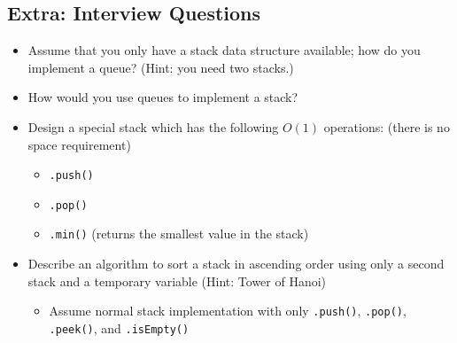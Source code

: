\documentclass[10pt]{article}
\begin{document}
\subsection*{Extra: Interview Questions}
\begin{itemize}
    \item Assume that you only have a stack data structure available; how do you implement a queue? (Hint: you need two stacks.)
    \item How would you use queues to implement a stack?
    \item Design a special stack which has the following $O(1)$ operations: (there is no space requirement)
    \begin{itemize}
        \item \texttt{.push()}
        \item \texttt{.pop()}
        \item \texttt{.min()} (returns the smallest value in the stack)
    \end{itemize}
    \item Describe an algorithm to sort a stack in ascending order using only a second stack and a temporary variable (Hint: Tower of Hanoi)
    \begin{itemize}
        \item Assume normal stack implementation with only \texttt{.push()}, \texttt{.pop()}, \texttt{.peek()}, and \texttt{.isEmpty()}
    \end{itemize}
\end{itemize}
\end{document}

